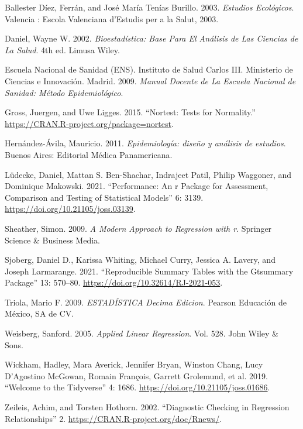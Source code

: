 \documentclass[
  letterpaper,
  DIV=11,
  numbers=noendperiod]{scrartcl}
\newlength{\cslhangindent}
\newenvironment{CSLReferences}[2] %
 {\begin{list}{}{%
  \setlength{\itemindent}{0pt}
  \setlength{\leftmargin}{0pt}
  \setlength{\parsep}{0pt}
  \ifodd #1
   \setlength{\leftmargin}{\cslhangindent}
   \setlength{\itemindent}{-1\cslhangindent}
  \fi
  \setlength{\itemsep}{#2\baselineskip}}}
 {\end{list}}
\begin{document}
\label{refs}
\begin{CSLReferences}{1}{0}
Ballester Díez, Ferrán, and José María Tenías Burillo. 2003.
\emph{Estudios Ecológicos}. Valencia : Escola Valenciana d{'}Estudis per
a la Salut, 2003.

Daniel, Wayne W. 2002. \emph{Bioestadística: Base Para El Análisis de
Las Ciencias de La Salud}. 4th ed. Limusa Wiley.

Escuela Nacional de Sanidad (ENS). Instituto de Salud Carlos III.
Ministerio de Ciencias e Innovación. Madrid. 2009. \emph{Manual Docente
de La Escuela Nacional de Sanidad: Método Epidemiológico}.

Gross, Juergen, and Uwe Ligges. 2015. {``Nortest: Tests for
Normality.''} \url{https://CRAN.R-project.org/package=nortest}.

Hernández-Ávila, Mauricio. 2011. \emph{Epidemiología: diseño y análisis
de estudios}. Buenos Aires: Editorial Médica Panamericana.

Lüdecke, Daniel, Mattan S. Ben-Shachar, Indrajeet Patil, Philip
Waggoner, and Dominique Makowski. 2021.
{``{\textbraceleft}Performance{\textbraceright}: An
{\textbraceleft}r{\textbraceright} Package for Assessment, Comparison
and Testing of Statistical Models''} 6: 3139.
\url{https://doi.org/10.21105/joss.03139}.

Sheather, Simon. 2009. \emph{A Modern Approach to Regression with r}.
Springer Science \& Business Media.

Sjoberg, Daniel D., Karissa Whiting, Michael Curry, Jessica A. Lavery,
and Joseph Larmarange. 2021. {``Reproducible Summary Tables with the
Gtsummary Package''} 13: 570--80.
\url{https://doi.org/10.32614/RJ-2021-053}.

Triola, Mario F. 2009. \emph{ESTADÍSTICA Decima Edicion}. Pearson
Educación de México, SA de CV.

Weisberg, Sanford. 2005. \emph{Applied Linear Regression}. Vol. 528.
John Wiley \& Sons.

Wickham, Hadley, Mara Averick, Jennifer Bryan, Winston Chang, Lucy
D'Agostino McGowan, Romain François, Garrett Grolemund, et al. 2019.
{``Welcome to the {\textbraceleft}Tidyverse{\textbraceright}''} 4: 1686.
\url{https://doi.org/10.21105/joss.01686}.

Zeileis, Achim, and Torsten Hothorn. 2002. {``Diagnostic Checking in
Regression Relationships''} 2.
\url{https://CRAN.R-project.org/doc/Rnews/}.

\end{CSLReferences}
\end{document}
